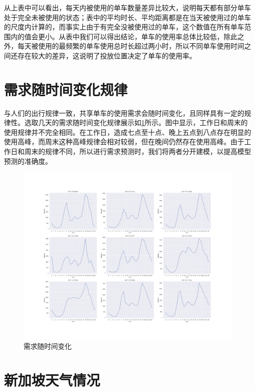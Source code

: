 \documentclass[]{tongjithesis}
\numberwithin{equation}{chapter}
\begin{document}
从上表中可以看出，每天内被使用的单车数量差异比较大，说明每天都有部分单车处于完全未被使用的状态；表中的平均时长、平均距离都是在当天被使用过的单车的尺度内计算的，而事实上由于有完全没被使用过的单车，这个数值在所有单车范围内的值会更小。从表中我们可以得出结论，单车的使用率总体比较低，除此之外，每天被使用的最频繁的单车使用总时长超过两小时，所以不同单车使用时间之间还存在较大的差异，这说明了投放位置决定了单车的使用率。

\section{需求随时间变化规律}

与人们的出行规律一致，共享单车的使用需求会随时间变化，且同样具有一定的规律性。选取几天的需求随时间变化规律展示如\ref{demand}所示。图中显示，工作日和周末的使用规律并不完全相同。在工作日，造成七点至十点、晚上五点到八点存在明显的使用高峰，而周末这种高峰规律会相对较弱，但在晚间仍然存在使用高峰。由于工作日和周末的规律不同，所以进行需求预测时，我们将两者分开建模，以提高模型预测的准确度。
\begin{figure}[H]
	\centering
	\includegraphics[width= 1.0 \textwidth]{figures_main/week_demand.png}
	\caption{需求随时间变化}
	\label{demand}
\end{figure}

\section{新加坡天气情况}
\end{document}

